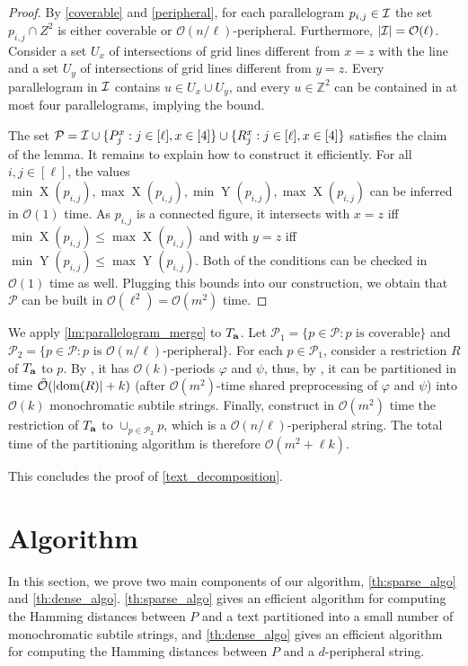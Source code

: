 \documentclass[11pt, letterpaper]{article}
\theoremstyle{plain}
\theoremstyle{definition}
\theoremstyle{remark}
\newcommand{\Z}{\mathbb{Z}}
\renewcommand{\O}{\mathcal{O}}
\newcommand{\tO}{\tilde{\mathcal{O}}}
\renewcommand{\phi}{\varphi}
\DeclareMathOperator*{\X}{X}
\DeclareMathOperator*{\Y}{Y}
\newcommand{\absolute}[1]{\left\lvert#1\right\rvert}
\begin{document}
\begin{proof}
By \cref{coverable} and \cref{peripheral}, for each parallelogram $p_{i,j} \in \mathcal{I}$ the set $p_{i,j} \cap Z^2$ is either coverable or $\O(n/\ell)$-peripheral. Furthermore, $\absolute{\I} = \O(\ell)$. Consider a set $U_x$ of intersections of grid lines different from $x=z$ with the line and a set $U_y$ of intersections of grid lines different from $y=z$. Every parallelogram in $\mathcal{I}$ contains $u \in U_x \cup U_y$, and every $u \in \Z^2$ can be contained in at most four parallelograms, implying the bound. 

The set $\mathcal{P} = \mathcal{I} \cup \{P_j^x : j \in [\ell], x \in [4]\} \cup \{R_j^x : j \in [\ell], x \in [4]\}$ satisfies the claim of the lemma. It remains to explain how to construct it efficiently. For all $i,j \in [\ell]$, the values $\min \X(p_{i,j}), \max \X(p_{i,j}), \min \Y(p_{i,j}), \max \X(p_{i,j})$ can be inferred in $\O(1)$ time. As $p_{i,j}$ is a connected figure, it intersects with $x = z$ iff $\min \X(p_{i,j}) \le \max \X(p_{i,j})$ and with $y = z$ iff $\min \Y(p_{i,j}) \le \max \Y(p_{i,j})$. Both of the conditions can be checked in $\O(1)$ time as well. Plugging this bounds into our construction, we obtain that $\mathcal{P}$ can be built in $\O(\ell^2) = \O(m^2)$ time. 
\end{proof}

We apply \cref{lm:parallelogram_merge} to $T_\mathbf{a}$. Let $\mathcal{P}_1 = \{p \in \mathcal{P} : p \text { is coverable}\}$ and $\mathcal{P}_2 = \{p \in \mathcal{P} : p \text { is }\O(n/\ell)\text{-peripheral}\}$. For each $p \in \mathcal{P}_1$, consider a restriction $R$ of $T_\mathbf{a}$ to $p$. By , it has $\O(k)$-periods $\phi$ and $\psi$, thus, by , it can be partitioned in time $\tO(\absolute{\d{R}} + k)$ (after $\O(m^2)$-time shared preprocessing of $\phi$ and $\psi$) into $\O(k)$ monochromatic subtile strings. Finally, construct in $\O(m^2)$ time the restriction of $T_\mathbf{a}$ to $\cup_{p \in \mathcal{P_2}} p$, which is a $\O(n / \ell)$-peripheral string. The total time of the partitioning algorithm is therefore $\O(m^2+\ell k)$.

This concludes the proof of \cref{text_decomposition}.

\section{Algorithm}
\label{sec:algorithm}
In this section, we prove two main components of our algorithm, \cref{th:sparse_algo} and \cref{th:dense_algo}. \cref{th:sparse_algo} gives an efficient algorithm for computing the Hamming distances between $P$ and a text partitioned into a small number of monochromatic subtile strings, and \cref{th:dense_algo} gives an efficient algorithm for computing the Hamming distances between $P$ and a $d$-peripheral string.
\end{document}
